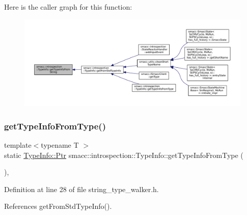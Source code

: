 Here is the caller graph for this function\+:
\nopagebreak
\begin{figure}[H]
\begin{center}
\leavevmode
\includegraphics[width=350pt]{classsmacc_1_1introspection_1_1TypeInfo_a47d65b6c61499d7ae8ab9f6325c84837_icgraph}
\end{center}
\end{figure}
\mbox{\label{classsmacc_1_1introspection_1_1TypeInfo_a8716ca6ac890b4582986d9fe4f5962ad}} 
\subsubsection{\texorpdfstring{get\+Type\+Info\+From\+Type()}{getTypeInfoFromType()}}
{\footnotesize\ttfamily template$<$typename T $>$ \\
static \hyperlink{classsmacc_1_1introspection_1_1TypeInfo_aa6ffd9c39811d59f7c771941b7fad860}{Type\+Info\+::\+Ptr} smacc\+::introspection\+::\+Type\+Info\+::get\+Type\+Info\+From\+Type (\begin{DoxyParamCaption}{ }\end{DoxyParamCaption})\hspace{0.3cm}{\ttfamily [inline]}, {\ttfamily [static]}}



Definition at line 28 of file string\+\_\+type\+\_\+walker.\+h.



References get\+From\+Std\+Type\+Info().


